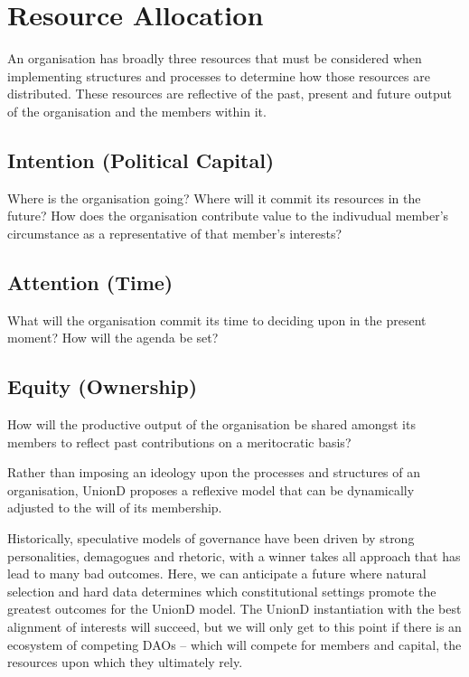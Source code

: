 \documentclass[12pt,twocolumn]{article}
\begin{document}
\section {Resource Allocation}

An organisation has broadly three resources that must be considered when implementing structures and processes to determine how those resources are distributed. These resources are reflective of the past, present and future output of the organisation and the members within it. 

\subsection{Intention (Political Capital)}

Where is the organisation going? Where will it commit its resources in the future? How does the organisation contribute value to the indivudual member's circumstance as a representative of that member's interests?

\subsection{Attention (Time)}

What will the organisation commit its time to deciding upon in the present moment? How will the agenda be set?

\subsection{Equity (Ownership)}

How will the productive output of the organisation be shared amongst its members to reflect past contributions on a meritocratic basis?

Rather than imposing an ideology upon the processes and structures of an organisation, UnionD proposes a reflexive model that can be dynamically adjusted to the will of its membership. 

Historically, speculative models of governance have been driven by strong personalities, demagogues and rhetoric, with a winner takes all approach that has lead to many bad outcomes.  Here, we can anticipate a future where natural selection and hard data determines which constitutional settings promote the greatest outcomes for the UnionD model. The UnionD instantiation with the best alignment of interests will succeed, but we will only get to this point if there is an ecosystem of competing DAOs -- which will compete for members and capital, the resources upon which they ultimately rely.
\end{document}
